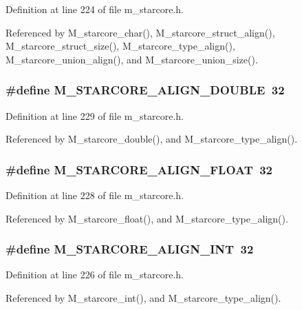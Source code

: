Definition at line 224 of file m\_\-starcore.h.

Referenced by M\_\-starcore\_\-char(), M\_\-starcore\_\-struct\_\-align(), M\_\-starcore\_\-struct\_\-size(), M\_\-starcore\_\-type\_\-align(), M\_\-starcore\_\-union\_\-align(), and M\_\-starcore\_\-union\_\-size().
\subsubsection{\setlength{\rightskip}{0pt plus 5cm}\#define M\_\-STARCORE\_\-ALIGN\_\-DOUBLE~32}\label{m__starcore_8h_e76b6c099ae761b77f64e4a13edd9026}




Definition at line 229 of file m\_\-starcore.h.

Referenced by M\_\-starcore\_\-double(), and M\_\-starcore\_\-type\_\-align().
\subsubsection{\setlength{\rightskip}{0pt plus 5cm}\#define M\_\-STARCORE\_\-ALIGN\_\-FLOAT~32}\label{m__starcore_8h_935b1264de5c1d691cd0c776a1f004aa}




Definition at line 228 of file m\_\-starcore.h.

Referenced by M\_\-starcore\_\-float(), and M\_\-starcore\_\-type\_\-align().
\subsubsection{\setlength{\rightskip}{0pt plus 5cm}\#define M\_\-STARCORE\_\-ALIGN\_\-INT~32}\label{m__starcore_8h_c37a2c75777bca1d3db9376297dd26b2}




Definition at line 226 of file m\_\-starcore.h.

Referenced by M\_\-starcore\_\-int(), and M\_\-starcore\_\-type\_\-align().
